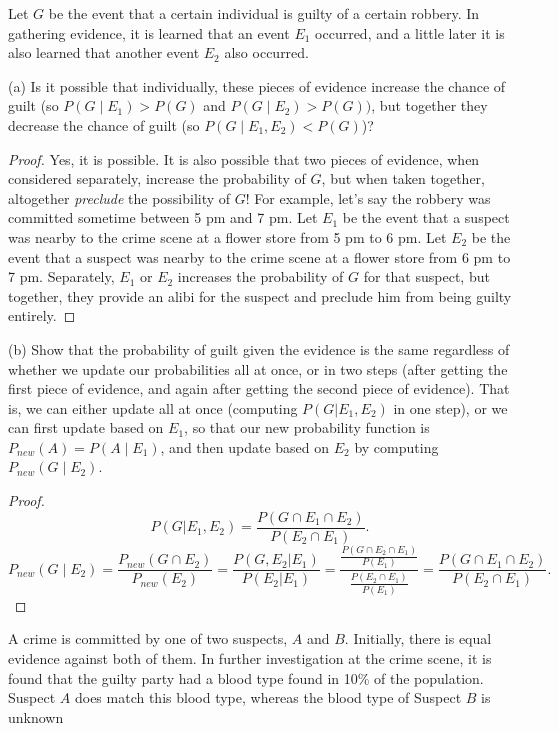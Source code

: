 \documentclass[10pt]{article}
\newenvironment{problem}[2][Problem]{\begin{trivlist}
\item[\hskip \labelsep {\bfseries #1}\hskip \labelsep {\bfseries #2.}]}{\end{trivlist}}
\begin{document}
\begin{problem}{3}
Let $G$ be the event that a certain individual is guilty of a certain robbery. In
gathering evidence, it is learned that an event $E_1$ occurred, and a little later it
is also learned that another event $E_2$ also occurred.
\end{problem}

(a) Is it possible that individually, these pieces of evidence increase the chance
of guilt (so $P(G \mid E_1) > P(G)$ and $P(G \mid E_2) > P(G))$, but together they decrease
the chance of guilt (so $P(G \mid E_1, E_2) < P(G)$)?

\begin{proof}
Yes, it is possible. It is also possible that two pieces of evidence, when considered separately, increase the probability of $G$, but when taken together, altogether \textit{preclude} the possibility of $G$! For example, let's say the robbery was committed sometime between 5 pm and 7 pm. Let $E_1$ be the event that a suspect was nearby to the crime scene at a flower store from 5 pm to 6 pm. Let $E_2$ be the event that a suspect was nearby to the crime scene at a flower store from 6 pm to 7 pm. Separately, $E_1$ or $E_2$ increases the probability of $G$ for that suspect, but together, they provide an alibi for the suspect and preclude him from being guilty entirely.
\end{proof}

(b) Show that the probability of guilt given the evidence is the same regardless
of whether we update our probabilities all at once, or in two steps (after getting
the first piece of evidence, and again after getting the second piece of evidence).
That is, we can either update all at once (computing $P(G|E_1, E_2)$ in one step),
or we can first update based on $E_1$, so that our new probability function is
$P_{new}(A) = P(A \mid E_1)$, and then update based on $E_2$ by computing $P_{new}(G \mid E_2)$.

\begin{proof}

\[
    P(G|E_1, E_2) = \frac{P(G \cap E_1 \cap E_2)}{P(E_2 \cap E_1)}.
\]
\[
    P_{new}(G \mid E_2) = \frac{P_{new}(G \cap E_2)}{P_{new}(E_2)} = \frac{P(G, E_2 | E_1)}{P(E_2 | E_1)} = \frac{
    \frac{P(G \cap E_2 \cap E_1)}{P(E_1)}}{\frac{P(E_2 \cap E_1)}{P(E_1)}} = \frac{P(G \cap E_1 \cap E_2)}{P(E_2 \cap E_1)}.
    
\]

\end{proof}
\begin{problem}{4}
A crime is committed by one of two suspects, $A$ and $B$. Initially, there is equal
evidence against both of them. In further investigation at the crime scene, it is
found that the guilty party had a blood type found in 10\% of the population.
Suspect $A$ does match this blood type, whereas the blood type of Suspect $B$ is
unknown
\end{problem}
\end{document}
